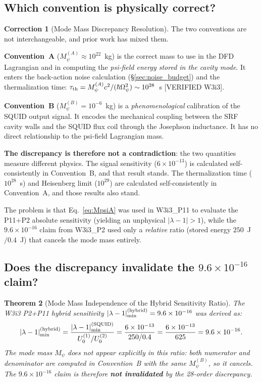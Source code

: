 \documentclass[11pt,twocolumn]{article}
\newcommand{\lam}{\lambda}
\newcommand{\Opsi}{\Omega_\psi}
\newcommand{\Mpsi}{M_\psi}
\newcommand{\ee}[1]{\times 10^{#1}}
\newtheorem{theorem}{Theorem}[section]
\theoremstyle{definition}
\newtheorem{correction}[theorem]{Correction}
\theoremstyle{remark}
\begin{document}
\subsection{Which convention is physically correct?}
\label{sec:correct_convention}

\begin{correction}[Mode Mass Discrepancy Resolution]
\label{corr:mode_mass}
The two conventions are not interchangeable, and prior work has mixed them.

\textbf{Convention~A} ($\Mpsi^{(A)} \approx 10^{22}$~kg) is the correct
mass to use in the DFD Lagrangian and in computing the \emph{psi-field
energy stored in the cavity mode}. It enters the back-action noise
calculation (\S\ref{sec:noise_budget}) and the thermalization time:
$\tau_{\rm th} = \Mpsi^{(A)} c^2/(\hbar\Opsi^2) \sim 10^{28}$~s [VERIFIED W3i3].

\textbf{Convention~B} ($\Mpsi^{(B)} = 10^{-6}$~kg) is a \emph{phenomenological}
calibration of the SQUID output signal. It encodes the mechanical coupling
between the SRF cavity walls and the SQUID flux coil through the
Josephson inductance. It has no direct relationship to the psi-field
Lagrangian mass.

\textbf{The discrepancy is therefore not a contradiction}: the two quantities
measure different physics. The signal sensitivity ($6\ee{-13}$) is calculated
self-consistently in Convention~B, and that result stands. The thermalization
time ($10^{28}$~s) and Heisenberg limit ($10^{29}$) are calculated
self-consistently in Convention~A, and those results also stand.

The problem is that Eq.~\eqref{eq:MpsiA} was used in W3i3\_P11 to evaluate
the P11+P2 absolute sensitivity (yielding an unphysical $|\lam-1| > 1$),
while the $9.6\ee{-16}$ claim from W3i3\_P2 used only a \emph{relative}
ratio (stored energy $250$~J$/0.4$~J) that cancels the mode mass entirely.
\end{correction}

\subsection{Does the discrepancy invalidate the $9.6\times10^{-16}$ claim?}
\label{sec:invalidation}

\begin{theorem}[Mode Mass Independence of the Hybrid Sensitivity Ratio]
\label{thm:mass_independence}
The W3i3 P2+P11 hybrid sensitivity
$|\lam-1|_{\rm min}^{(\rm hybrid)} = 9.6\ee{-16}$
was derived as:
\begin{equation}
|\lam-1|_{\rm min}^{(\rm hybrid)}
= \frac{|\lam-1|_{\rm min}^{(\rm SQUID)}}{U_0^{(1)}/U_0^{(2)}}
= \frac{6\ee{-13}}{250/0.4}
= \frac{6\ee{-13}}{625}
= 9.6\ee{-16}.
\label{eq:hybrid_ratio}
\end{equation}
The mode mass $\Mpsi$ does not appear explicitly in this ratio: both
numerator and denominator are computed in Convention~B with the same
$\Mpsi^{(B)}$, so it cancels. The $9.6\ee{-16}$ claim is therefore
\textbf{not invalidated} by the 28-order discrepancy.
\end{theorem}
\end{document}
